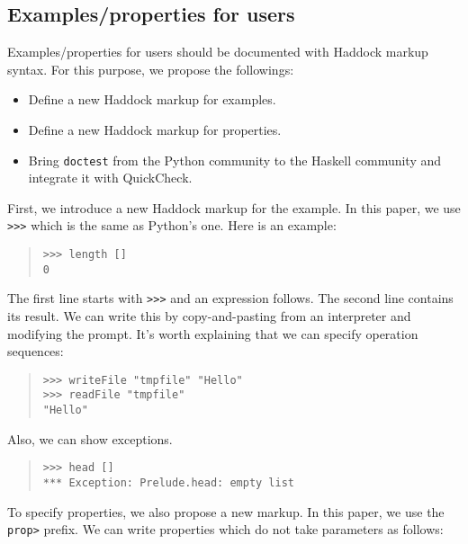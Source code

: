 \documentclass[preprint]{sigplanconf}
\begin{document}
\subsection{Examples/properties for users}
\label{sec:for-users}

Examples/properties for users should be documented with Haddock markup syntax.
For this purpose, we propose the followings:

\begin{itemize}
\item Define a new Haddock markup for examples.
\item Define a new Haddock markup for properties.
\item Bring {\tt doctest} from the Python community to the Haskell
community and integrate it with QuickCheck.
\end{itemize}

First, we introduce a new Haddock markup for the example.
In this paper, we use {\tt >>>} which is the same as Python's one.
Here is an example:

\begin{quote}
\small
\begin{verbatim}
>>> length []
0
\end{verbatim}
\end{quote}

\noindent The first line starts with {\tt >>>} and an expression follows. The second line contains its result. We can write this by copy-and-pasting from an interpreter and modifying the prompt.
It's worth explaining that we can specify operation sequences:

\begin{quote}
\small
\begin{verbatim}
>>> writeFile "tmpfile" "Hello"
>>> readFile "tmpfile"
"Hello"
\end{verbatim}
\end{quote}

\noindent Also, we can show exceptions.

\begin{quote}
\small
\begin{verbatim}
>>> head []
*** Exception: Prelude.head: empty list
\end{verbatim}
\end{quote}

To specify properties, we also propose a new markup. In this paper, we use the {\tt prop>} prefix. We can write properties which do not take parameters as follows:
\end{document}

